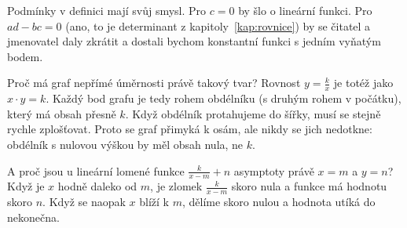 Podmínky v definici mají svůj smysl. Pro $c = 0$ by šlo o lineární funkci. Pro $ad - bc = 0$ (ano, to je determinant z kapitoly~\ref{kap:rovnice}) by se čitatel a jmenovatel daly zkrátit a dostali bychom konstantní funkci s jedním vyňatým bodem.

Proč má graf nepřímé úměrnosti právě takový tvar? Rovnost $y = \frac{k}{x}$ je totéž jako $x\cdot y = k$. Každý bod grafu je tedy rohem obdélníku (s druhým rohem v počátku), který má obsah přesně $k$. Když obdélník protahujeme do šířky, musí se stejně rychle zplošťovat. Proto se graf přimyká k osám, ale nikdy se jich nedotkne: obdélník s nulovou výškou by měl obsah nula, ne $k$.

\begin{center}
\end{center}

A proč jsou u lineární lomené funkce $\frac{k}{x - m} + n$ asymptoty právě $x = m$ a $y = n$? Když je $x$ hodně daleko od $m$, je zlomek $\frac{k}{x - m}$ skoro nula a funkce má hodnotu skoro $n$. Když se naopak $x$ blíží k $m$, dělíme skoro nulou a hodnota utíká do nekonečna.


